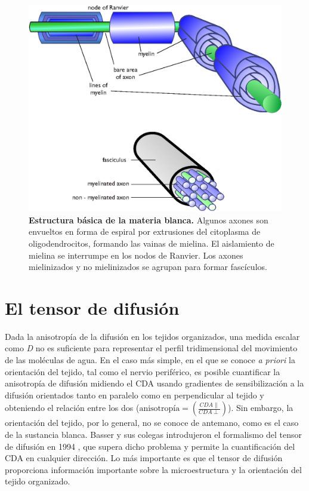 \documentclass[12pt,a5,twoside]{book}
\begin{document}
\begin{figure}
	\centering
    \includegraphics [scale=0.6,center] {axons2.eps}
    \caption{\textbf{Estructura básica de la materia blanca.} Algunos axones son envueltos en forma de espiral por extrusiones del citoplasma de oligodendrocitos, formando las vainas de mielina. El aislamiento de mielina se interrumpe en los nodos de Ranvier. Los axones mielinizados y no mielinizados se agrupan para formar fascículos.}
    \label{F:axons2}
\end{figure}

\section{El tensor de difusión}

Dada la anisotropía de la difusión en los tejidos organizados, una medida escalar como {\it D} no es suficiente para representar el perfil tridimensional del movimiento de las moléculas de agua. En el caso más simple, en el que se conoce {\it a priori} la orientación del tejido, tal como el nervio periférico, es posible cuantificar la anisotropía de difusión midiendo el CDA usando gradientes de sensibilización a la difusión orientados tanto en paralelo como en perpendicular al tejido y obteniendo el relación entre los dos ($\mbox{anisotrop\'ia} = (\frac{CDA\parallel}{CDA\perp})$). Sin embargo, la orientación del tejido, por lo general, no se conoce de antemano, como es el caso de la sustancia blanca. Basser y sus colegas introdujeron el formalismo del tensor de difusión en 1994 \citep{Basser_1994_2,Basser_1994}, que supera dicho problema y permite la cuantificación del CDA en cualquier dirección. Lo más importante es que el tensor de difusión proporciona información importante sobre la microestructura y la orientación del tejido organizado.
\end{document}

